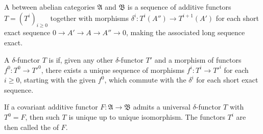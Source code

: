 A  between abelian categories $\mathfrak{A}$ and $\mathfrak{B}$ is a sequence of additive functors $T = (T^i)_{i \geqslant 0}$ together with morphisms $\delta^i: T^i(A'') \to T^{i+1}(A')$ for each short exact sequence $0 \to A' \to A \to A'' \to 0$, making the associated long sequence exact.

A $\delta$-functor $T$ is  if, given any other $\delta$-functor $T'$ and a morphism of functors $f^0: T^0 \to T'^0$, there exists a unique sequence of morphisms $f^i: T^i \to T'^i$ for each $i \geqslant 0$, starting with the given $f^0$, which commute with the $\delta^i$ for each short exact sequence.

If a covariant additive functor $F: \mathfrak{A} \to \mathfrak{B}$ admits a universal $\delta$-functor $T$ with $T^0 = F$, then such $T$ is unique up to unique isomorphism. The functors $T^i$ are then called the  of $F$.
